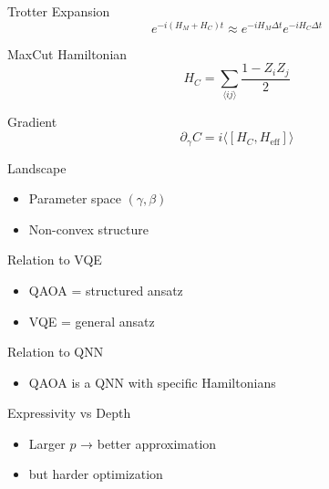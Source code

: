 \documentclass{beamer}
\begin{document}
\begin{frame}{Trotter Expansion}
\[
e^{-i(H_M + H_C)t} \approx e^{-iH_M \Delta t} e^{-iH_C \Delta t}
\]
\end{frame}

\begin{frame}{MaxCut Hamiltonian}
\[
H_C = \sum_{\langle ij\rangle} \frac{1 - Z_i Z_j}{2}
\]
\end{frame}

\begin{frame}{Gradient}
\[
\partial_\gamma C = i \langle [H_C, H_{\text{eff}}] \rangle
\]
\end{frame}

\begin{frame}{Landscape}
\begin{itemize}
\item Parameter space $(\gamma,\beta)$
\item Non-convex structure
\end{itemize}
\end{frame}

\begin{frame}{Relation to VQE}
\begin{itemize}
\item QAOA = structured ansatz
\item VQE = general ansatz
\end{itemize}
\end{frame}

\begin{frame}{Relation to QNN}
\begin{itemize}
\item QAOA is a QNN with specific Hamiltonians
\end{itemize}
\end{frame}

\begin{frame}{Expressivity vs Depth}
\begin{itemize}
\item Larger $p$ → better approximation
\item but harder optimization
\end{itemize}
\end{frame}
\end{document}
